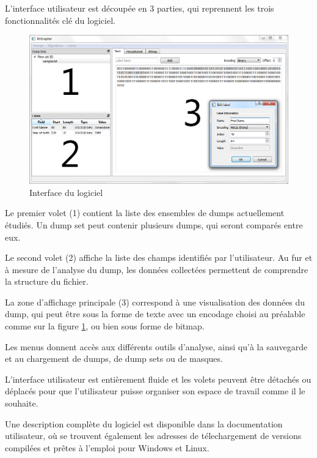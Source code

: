 L'interface utilisateur est découpée en 3 parties, qui reprennent les trois fonctionnalités clé du logiciel.

\begin{figure}[!h]
  \begin{center}
  \includegraphics[width=\textwidth]{res/03-2-interface.png}
  \caption{Interface du logiciel}
  \label{03-2-interface}
  \end{center}
\end{figure}

Le premier volet (1) contient la liste des ensembles de dumps actuellement étudiés. Un dump set peut contenir plusieurs dumps, qui seront comparés entre eux.

Le second volet (2) affiche la liste des champs identifiés par l'utilisateur. Au fur et à mesure de l'analyse du dump, les données collectées permettent de comprendre la structure du fichier.

La zone d'affichage principale (3) correspond à une visualisation des données du dump, qui peut être sous la forme de texte avec un encodage choisi au préalable comme sur la figure \ref{03-2-interface}, ou bien sous forme de bitmap.

Les menus donnent accès aux différents outils d'analyse, ainsi qu'à la sauvegarde et au chargement de dumps, de dump sets ou de masques.

L'interface utilisateur est entièrement fluide et les volets peuvent être détachés ou déplacés pour que l'utilisateur puisse organiser son espace de travail comme il le souhaite.

Une description complète du logiciel est disponible dans la documentation utilisateur, où se trouvent également les adresses de télechargement de versions compilées et prêtes à l'emploi pour Windows et Linux.

